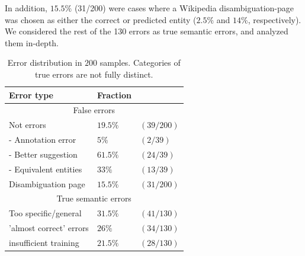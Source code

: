 \documentclass[11pt,letterpaper]{article}
\begin{document}
	In addition, $15.5\%$ (31/200) were cases where a Wikipedia disambiguation-page was chosen as either the correct or predicted entity ($2.5\%$ and $14\%$, respectively). We considered the rest of the 130 errors as true semantic errors, and analyzed them in-depth.
	
	\begin{table}[ht]
		\begin{center}
			\begin{tabular}{|p{3.5cm}| ll |}
				\hline \bf Error type 		& \bf Fraction  	&\\ 
				\hline \multicolumn{3}{|c|}{False errors} \\
				\hline Not errors 			& $19.5\%$ 	& $(39/200)$  \\ 
				- Annotation error 			& $5\%$    	& $(2/39)$ \\ 
				- Better suggestion			& $61.5\%$ 	&$(24/39)$ \\
			    - Equivalent entities		& $ 33\%$ 	&$(13/39)$ \\ 
				Disambiguation page			& $15.5\%$   	&$(31/200)$ \\ 
				\hline \multicolumn{3}{|c|}{True semantic errors} \\
				\hline	Too specific/general  	& $31.5\%$ 	&$(41/130)$ \\ 
				'almost correct' errors		& $26\%$ 	&$(34/130)$ \\ 
				insufficient training		& $21.5\%$ &$(28/130)$ \\
				\hline
			\end{tabular}
		\end{center}
		\caption{\label{tab:d} Error distribution in $200$ samples. Categories of true errors are not fully distinct.}
	\end{table}
	
\end{document}
